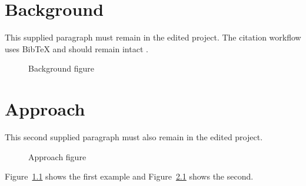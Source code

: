 \documentclass[12pt,oneside,openany]{book}
\begin{document}
\frontmatter
\tableofcontents
\mainmatter

\chapter{Background}
This supplied paragraph must remain in the edited project. The citation workflow uses BibTeX and should remain intact \cite{doe2024}.

\begin{figure}[htbp]
  \centering
  \caption{Background figure}
  \label{fig:background}
\end{figure}

\chapter{Approach}
This second supplied paragraph must also remain in the edited project.

\begin{figure}[htbp]
  \centering
  \caption{Approach figure}
  \label{fig:approach}
\end{figure}

Figure~\ref{fig:background} shows the first example and Figure~\ref{fig:approach} shows the second.



\end{document}
